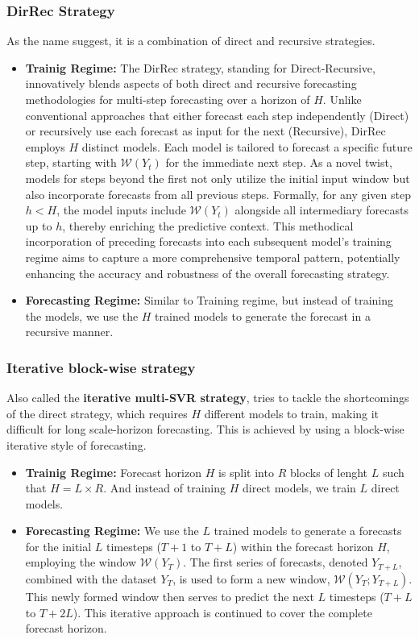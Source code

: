 \documentclass{article}
\begin{document}
\subsubsection{DirRec Strategy}
As the name suggest, it is a combination of direct and recursive strategies.
\begin{itemize}
    \item \textbf{Trainig Regime:} The DirRec strategy, standing for Direct-Recursive, innovatively blends aspects of both direct and recursive forecasting methodologies for multi-step forecasting over a horizon of \(H\). Unlike conventional approaches that either forecast each step independently (Direct) or recursively use each forecast as input for the next (Recursive), DirRec employs \(H\) distinct models. Each model is tailored to forecast a specific future step, starting with \(\mathcal{W}(Y_t)\) for the immediate next step. As a novel twist, models for steps beyond the first not only utilize the initial input window but also incorporate forecasts from all previous steps. Formally, for any given step \(h < H\), the model inputs include \(\mathcal{W}(Y_t)\) alongside all intermediary forecasts up to \(h\), thereby enriching the predictive context. This methodical incorporation of preceding forecasts into each subsequent model's training regime aims to capture a more comprehensive temporal pattern, potentially enhancing the accuracy and robustness of the overall forecasting strategy.
    \item \textbf{Forecasting Regime:} Similar to Training regime, but instead of training the models, we use the \(H\) trained models to generate the forecast in a recursive manner.
\end{itemize}

\subsubsection{Iterative block-wise strategy}
Also called the \textbf{iterative multi-SVR strategy}, tries to tackle the shortcomings of the 
direct strategy, which requires \(H\) different models to train, making it difficult for long scale-horizon forecasting. 
This is achieved by using a block-wise iterative style of forecasting.
\begin{itemize}
    \item \textbf{Trainig Regime:} Forecast horizon \(H\) is split into \(R\) blocks of lenght \(L\) such that \(H = L \times R\). And instead of training \(H\) direct models, we train \(L\) direct models.
    \item \textbf{Forecasting Regime:} We use the \(L\) trained models to generate a forecasts for the initial \(L\) timesteps (\(T + 1\) to \(T + L\)) within the forecast horizon \(H\), employing the window \(\mathcal{W}(Y_T)\). The first series of forecasts, denoted \(Y_{T+L}\), combined with the dataset \(Y_T\), is used to form a new window, \(\mathcal{W}(Y_T; Y_{T+L})\). This newly formed window then serves to predict the next \(L\) timesteps (\(T + L\) to \(T + 2L\)). This iterative approach is continued to cover the complete forecast horizon.
\end{itemize}
\end{document}
